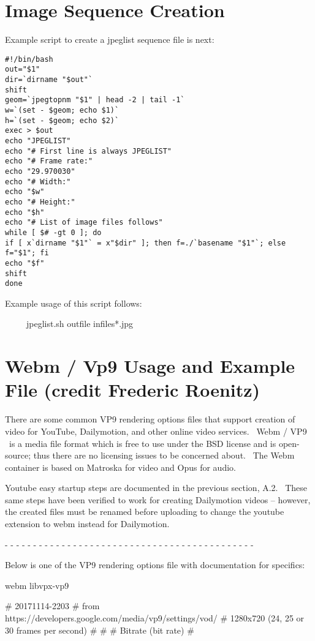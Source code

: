 \section{Image Sequence Creation}
\label{sec:Image Sequence Creation}
Example script to create a jpeglist sequence file is next:
\medskip

\begin{lstlisting}[numbers=none]
#!/bin/bash
out="$1"
dir=`dirname "$out"`
shift
geom=`jpegtopnm "$1" | head -2 | tail -1`
w=`(set - $geom; echo $1)`
h=`(set - $geom; echo $2)`
exec > $out
echo "JPEGLIST"
echo "# First line is always JPEGLIST"
echo "# Frame rate:"
echo "29.970030"
echo "# Width:"
echo "$w"
echo "# Height:"
echo "$h"
echo "# List of image files follows"
while [ $# -gt 0 ]; do
if [ x`dirname "$1"` = x"$dir" ]; then f=./`basename "$1"`; else f="$1"; fi
echo "$f"
shift
done
\end{lstlisting}
\medskip

Example usage of this script follows:
\medskip

\ \ \ \ \ jpeglist.sh outfile infiles*.jpg
\medskip

\section{Webm / Vp9 Usage and Example File (credit Frederic Roenitz)}
\label{sec:Webm / Vp9 Usage and Example File}

There are some common VP9 rendering options files that support creation of video for YouTube, Dailymotion, and other online video services. \ Webm / VP9 \ is a media file format which is free to use under the BSD license and is open-source; thus there are no licensing issues to be concerned about. \ The Webm container is based on Matroska for video and Opus for audio.
\medskip

Youtube easy startup steps are documented in the previous section, A.2. \ These same steps have been verified to work for creating Dailymotion videos -- however, the created files must be renamed before uploading to change the youtube extension to webm instead for Dailymotion.

{}- - - - - - - - - - - - - - - - - - - - - - - - - - - - - - - - - - - - - - - - - - - -
\medskip

Below is one of the VP9 rendering options file with documentation for specifics:
\medskip

webm libvpx-vp9
\medskip

\# 20171114-2203
\# from https://developers.google.com/media/vp9/settings/vod/
\# 1280x720 (24, 25 or 30 frames per second)
\#
\#
\# Bitrate (bit rate)
\#

